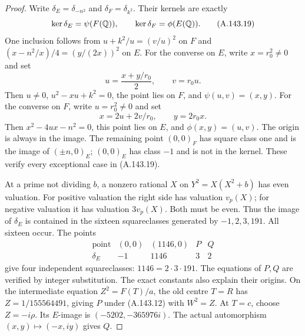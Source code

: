 \begin{proof}
Write \(\delta_E=\delta_{-n^2}\) and
\(\delta_F=\delta_{k^2}\).
Their kernels are exactly
\[
                     \ker\delta_E=\psi(F(\mathbb Q)),\qquad
                     \ker\delta_F=\phi(E(\mathbb Q)).
\tag{A.143.19}
\]
One inclusion follows from
\(u+k^2/u=(v/u)^2\) on \(F\) and
\((x-n^2/x)/4=(y/(2x))^2\) on \(E\).
For the converse on \(E\), write \(x=r_0^2\ne0\) and set
\[
             u=\frac{x+y/r_0}{2},\qquad v=r_0u .
\tag{A.143.20}
\]
Then \(u\ne0\), \(u^2-xu+k^2=0\), the point lies on \(F\),
and \(\psi(u,v)=(x,y)\).
For the converse on \(F\), write \(u=r_0^2\ne0\) and set
\[
                         x=2u+2v/r_0,\qquad y=2r_0x .
\tag{A.143.21}
\]
Then \(x^2-4ux-n^2=0\), this point lies on \(E\), and
\(\phi(x,y)=(u,v)\).
The origin is always in the image.
The remaining point \((0,0)_F\) has square class one and is
the image of \((\pm n,0)_E\);
\((0,0)_E\) has class \(-1\) and is not in the kernel.
These verify every exceptional case in (A.143.19).

At a prime not dividing \(b\), a nonzero rational \(X\) on
\(Y^2=X(X^2+b)\) has even valuation.
For positive valuation the right side has valuation \(v_p(X)\);
for negative valuation it has valuation \(3v_p(X)\).
Both must be even.  Thus the image of \(\delta_E\) is contained
in the sixteen squareclasses generated by \(-1,2,3,191\).
All sixteen occur.  The points
\[
 \begin{array}{c|cccc}
 \text{point}&(0,0)&(1146,0)&P&Q\\ \hline
 \delta_E&-1&1146&3&2
 \end{array}
\tag{A.143.22}
\]
give four independent squareclasses: \(1146=2\cdot3\cdot191\).
The equations of \(P,Q\) are verified by integer substitution.
The exact constants also explain their origins.
On the intermediate equation \(Z^2=F(T)/a\), the old centre
\(T=R\) has \(Z=1/155564491\), giving \(P\) under
(A.143.12) with \(W^2=Z\).
At \(T=c\), choose \(Z=-i\rho\).
Its \(E\)-image is \((-5202,-365976i)\).
The actual automorphism \((x,y)\mapsto(-x,iy)\) gives \(Q\).


\end{proof}
